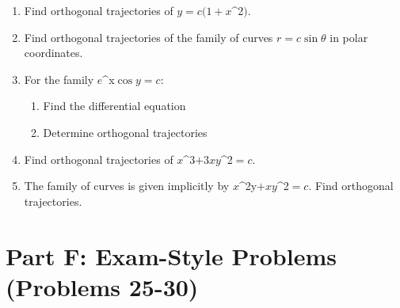 \documentclass[12pt]{article}
\begin{document}
\begin{enumerate}[start=20]
\item Find orthogonal trajectories of $y = c(1 + x$^{2}$)$.

\item Find orthogonal trajectories of the family of curves $r = c\sin\theta$ in polar coordinates.

\item For the family $e$^{x}$\cos y = c$:
\begin{enumerate}[label=(\alph*)]
    \item Find the differential equation
    \item Determine orthogonal trajectories
\end{enumerate}

\item Find orthogonal trajectories of $x$^{3}$ + 3xy$^{2}$ = c$.

\item The family of curves is given implicitly by $x$^{2y}$ + xy$^{2}$ = c$. Find orthogonal trajectories.
\end{enumerate}

\section*{Part F: Exam-Style Problems (Problems 25-30)}
\end{document}

